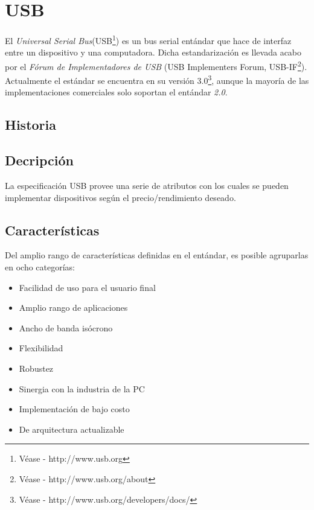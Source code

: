 \chapter{USB}
El \emph{Universal Serial Bus}(USB\footnote{V\'ease - http://www.usb.org}) es
un bus serial ent\'andar que hace de interfaz entre un dispositivo y una
computadora.
Dicha estandarizaci\'on es llevada acabo por el \emph{F\'orum de
Implementadores de USB} (USB Implementers Forum, USB-IF\footnote{V\'ease -
http://www.usb.org/about}). 
Actualmente el est\'andar se encuentra en su versi\'on 3.0\footnote{V\'ease -
http://www.usb.org/developers/docs/}, aunque la mayor\'ia de las
implementaciones comerciales solo soportan el ent\'andar \emph{2.0}.

\section{Historia}

\section{Decripci\'on}
La especificaci\'on USB provee una serie de atributos con los cuales se pueden
implementar dispositivos seg\'un el precio/rendimiento deseado.

\section{Caracter\'isticas}
Del amplio rango de caracter\'isticas definidas en el ent\'andar, es posible
agruparlas en ocho categor\'ias:

\begin{itemize}
 \item Facilidad de uso para el usuario final
 \item Amplio rango de aplicaciones
 \item Ancho de banda is\'ocrono
 \item Flexibilidad
 \item Robustez
 \item Sinergia con la industria de la PC
 \item Implementaci\'on de bajo costo
 \item De arquitectura actualizable
\end{itemize}

